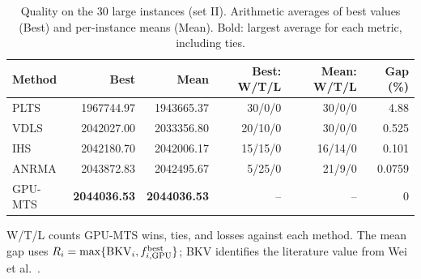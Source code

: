 \begin{table}[tbp]\centering\small
\caption{Quality on the 30 large instances (set II). Arithmetic averages of best values (Best) and per-instance means (Mean). Bold: largest average for each metric, including ties.}
\label{tab:benchmark-large}
\begin{tabular}{lrrrrr}
\toprule
Method & Best & Mean & Best: W/T/L & Mean: W/T/L & Gap (\%)\\
\midrule
PLTS & 1967744.97 & 1943665.37 & 30/0/0 & 30/0/0 & 4.88\\
VDLS & 2042027.00 & 2033356.80 & 20/10/0 & 30/0/0 & 0.525\\
IHS & 2042180.70 & 2042006.17 & 15/15/0 & 16/14/0 & 0.101\\
ANRMA & 2043872.83 & 2042495.67 & 5/25/0 & 21/9/0 & 0.0759\\
GPU-MTS & \textbf{2044036.53} & \textbf{2044036.53} & -- & -- & 0\\
\bottomrule\end{tabular}
\par\smallskip\parbox{.97\linewidth}{\footnotesize W/T/L counts GPU-MTS wins, ties, and losses against each method. The mean gap uses $R_i=\max\{\mathrm{BKV}_i,f^{\mathrm{best}}_{i,\rm GPU}\}$; BKV identifies the literature value from Wei et al.~\cite{Wei2026ANRMA}.}
\end{table}
